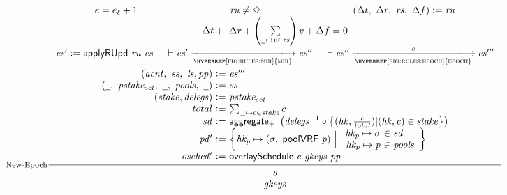 \begin{figure}[ht]
  \begin{equation}\label{eq:new-epoch}
    \inference[New-Epoch]
    {
      e = e_\ell + 1
      &
      \var{ru} \neq \Nothing
      &
      (\Delta t,~\Delta r,~\var{rs},~\Delta f)\leteq\var{ru}
      \\
      \Delta t+~\Delta r+\left(\sum\limits_{\wcard\mapsto v\in\var{rs}}\right)v+\Delta f=0
      \\
      \var{es'}\leteq\fun{applyRUpd}~\var{ru}~\var{es}
      &
      {
        \vdash
        \var{es'}
          \trans{\hyperref[fig:rules:mir]{mir}}{}\var{es''}
      }
      &
      {
        \vdash
        \var{es''}
          \trans{\hyperref[fig:rules:epoch]{epoch}}{\var{e}}\var{es'''}
      }
      \\~\\
      {\begin{array}{r@{~\leteq~}l}
          (\var{acnt},~\var{ss},~\var{ls}, \var{pp}) & \var{es'''} \\
         (\wcard,~\var{pstake_{set}},~\wcard,~\var{pools},~\wcard) & \var{ss} \\
         (\var{stake}, \var{delegs}) & \var{pstake_{set}} \\
         total & \sum_{\_ \mapsto c\in\var{stake}} c \\
          \var{sd} & \fun{aggregate_{+}}~\left(\var{delegs}^{-1}\circ
                     \left\{
                     (\var{hk}, \frac{\var{c}}{\var{total}}) \vert (\var{hk},
                     \var{c}) \in \var{stake}
                 \right\}\right) \\
          \var{pd'} &
            \left\{\var{hk_p}\mapsto(\sigma,~\fun{poolVRF}~\var{p})
            ~\Big\vert~
            {
              \begin{array}{r@{~\in~}l}
                \var{hk_p}\mapsto\sigma & \var{sd} \\
                \var{hk_p}\mapsto\var{p} & \var{pools}
              \end{array}
            }
            \right\}\\
          \var{osched'} & \overlaySchedule{e}{gkeys}{pp} \\
       \end{array}}
    }
    {
      {\begin{array}{c}
         \var{s} \\
         \var{gkeys} \\
       \end{array}}
}
\end{equation}
\end{figure}
